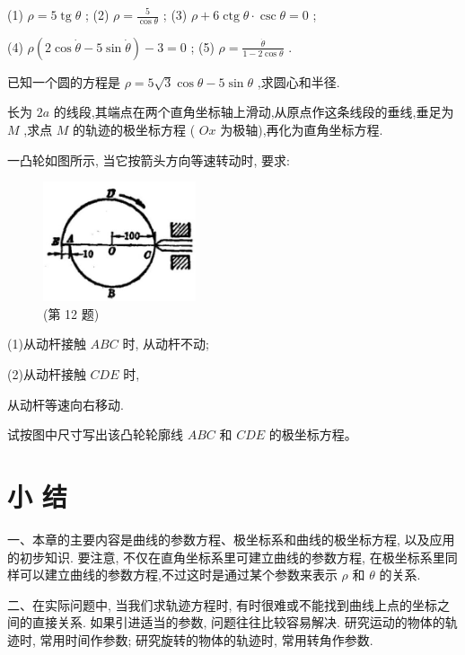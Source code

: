 \documentclass[lang=cn,newtx,12pt,scheme=chinese]{elegantbook}
\begin{document}
\begin{problemset}[习 题 十 四]
(1) \(\rho = 5\operatorname{tg}\theta\) ; (2) \(\rho = \frac{5}{\cos \theta }\) ; (3) \(\rho + 6\operatorname{ctg}\theta \cdot \csc \theta = 0\) ;

(4) \(\rho \left( {2\cos \dot{\theta } - 5\sin \dot{\theta }}\right) - 3 = 0\) ; (5) \(\rho = \frac{\dot{\theta }}{1 - 2\cos \theta }\) .

\item 已知一个圆的方程是 \(\rho = 5\sqrt{3}\cos \theta - 5\sin \theta\) ,求圆心和半径.

\item 长为 \({2a}\) 的线段,其端点在两个直角坐标轴上滑动,从原点作这条线段的垂线,垂足为 \(M\) ,求点 \(M\) 的轨迹的极坐标方程 ( \({Ox}\) 为极轴),再化为直角坐标方程.

\item 一凸轮如图所示, 当它按箭头方向等速转动时, 要求:

\begin{figure}[h]
  \centering
  \includegraphics[max width=0.4\textwidth]{images/01912cc2-ffb6-728e-9ae7-b113ff05c64b_189_903948.jpg}
  \caption{(第 12 题)}
\end{figure}

(1)从动杆接触 \({ABC}\) 时, 从动杆不动;

(2)从动杆接触 \({CDE}\) 时,

从动杆等速向右移动.

试按图中尺寸写出该凸轮轮廓线 \({ABC}\) 和 \({CDE}\) 的极坐标方程。

\end{problemset}

\chapter*{小 结}

一、本章的主要内容是曲线的参数方程、极坐标系和曲线的极坐标方程, 以及应用的初步知识. 要注意, 不仅在直角坐标系里可建立曲线的参数方程, 在极坐标系里同样可以建立曲线的参数方程,不过这时是通过某个参数来表示 \(\rho\) 和 \(\theta\) 的关系.

二、在实际问题中, 当我们求轨迹方程时, 有时很难或不能找到曲线上点的坐标之间的直接关系. 如果引进适当的参数, 问题往往比较容易解决. 研究运动的物体的轨迹时, 常用时间作参数; 研究旋转的物体的轨迹时, 常用转角作参数.
\end{document}
